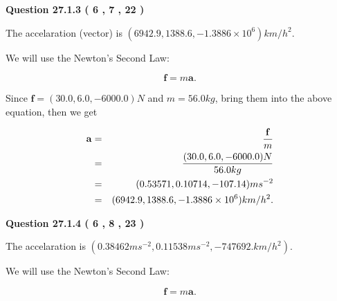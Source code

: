 \documentclass[12pt]{article}
\begin{document}
 
 
 
  
\vspace{0.2in}
  
{\textbf{\Large{Question
27.1.3 
 (           6 ,           7 ,          22 )
}}}
  
  
 
 
\noindent{}
 
 
The accelaration (vector) is
$(
6942.9,
1388.6 ,
-1.3886 \times 10^{6}
)km/h^2.
$
 
 
 
 
 
 
\noindent{}

We will use the Newton's Second Law:
 
\[
\mathbf{f}=m\mathbf{a}.
\]
 
Since $\mathbf{f}=( %
30.0,  %
6.0,  %
-6000.0 )N$
and $m= %
56.0 kg$, bring them into the above equation, then we get
 
\begin{eqnarray*}
\mathbf{a}&=&\frac{\mathbf{f}}m  \\
&=&\frac{(
30.0 ,
6.0 ,
-6000.0 )N
}{ %
56.0 kg}  \\
&=&(
0.53571 ,
0.10714,
-107.14
)ms^{-2} \\
&=&(
6942.9 ,
1388.6 ,
-1.3886 \times 10^{6}
)km/h^2.
\end{eqnarray*}
 
 
 
  
\vspace{0.2in}
  
{\textbf{\Large{Question
27.1.4 
 (           6 ,           8 ,          23 )
}}}
  
  
 
 
\noindent{}
 
 
The accelaration is
$(
0.38462ms^{-2},
0.11538ms^{-2},
-747692.km/h^2
).
$
 
 
 
 
 
 
\noindent{}

We will use the Newton's Second Law:
 
\[
\mathbf{f}=m\mathbf{a}.
\]
 
\end{document}
